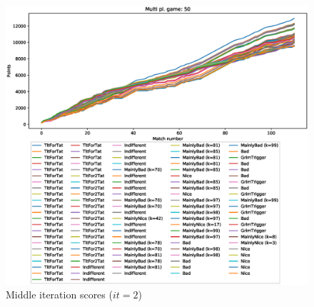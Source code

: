 \documentclass[journal,a4paper,10pt,twoside]{IEEEtran} %
\begin{document}
\begin{figure}[!ht]
    \centering
    \includegraphics[width=1\columnwidth]{../img/ripdmp-incr/ripdmp-scores-increasing-pop-50-r2}
    \caption{Middle iteration scores ($it=2$)}
    \label{fig:incrMI}
\end{figure}
\end{document}
